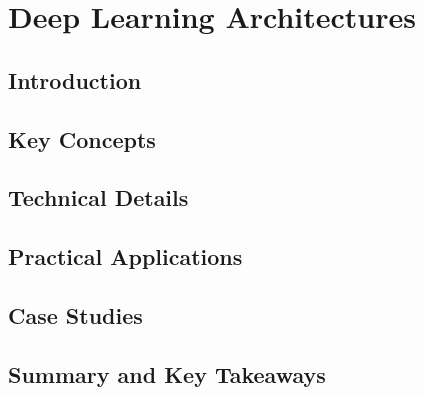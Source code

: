 ﻿%

\chapter{Deep Learning Architectures}
\label{ch:chapter-03}

\section{Introduction}


\section{Key Concepts}


\section{Technical Details}


\section{Practical Applications}


\section{Case Studies}


\section{Summary and Key Takeaways}


